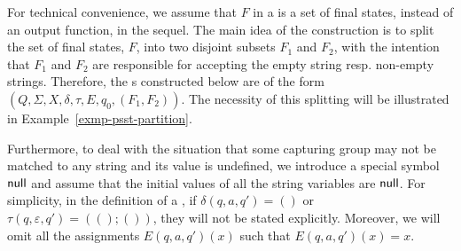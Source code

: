 


%  








For technical convenience, we assume that $F$ in a {\PSST} is a set of final states, instead of an output function, in the sequel. 
%
The main idea of the construction is to split the set of final states, $F$, into two disjoint subsets $F_1$ and $F_2$, with the intention that $F_1$ and $F_2$ are responsible for accepting the empty string resp. non-empty strings. 
Therefore, the {\PSST}s constructed below are of the form $(Q, \Sigma, X, \delta, \tau, E, q_0, (F_1, F_2))$. 
The necessity of this splitting will be illustrated in Example~\ref{exmp-psst-partition}.

Furthermore, to deal with the situation that some capturing group may not be matched to any string and its value is undefined, we introduce a special symbol $\mathsf{null}$ %
and assume that the initial values of all the string variables are $\mathsf{null}$. %
For simplicity, in the definition of a {\PSST}, if $\delta(q, a, q') = ()$ or $\tau(q, \varepsilon, q') = ((); ())$,  they will not be stated explicitly. Moreover, we will omit all the assignments $E(q, a, q')(x)$ such that $E(q, a, q')(x) = x$.


